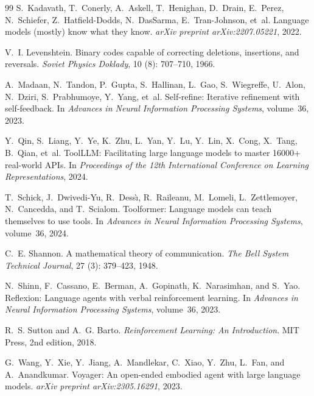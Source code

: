 \begin{thebibliography}{99}
S.~Kadavath, T.~Conerly, A.~Askell, T.~Henighan, D.~Drain, E.~Perez,
  N.~Schiefer, Z.~Hatfield-Dodds, N.~DasSarma, E.~Tran-Johnson, et~al.
\newblock Language models (mostly) know what they know.
\newblock \emph{arXiv preprint arXiv:2207.05221}, 2022.

V.~I. Levenshtein.
\newblock Binary codes capable of correcting deletions, insertions, and
  reversals.
\newblock \emph{Soviet Physics Doklady}, 10 (8): 707--710,
  1966.

A.~Madaan, N.~Tandon, P.~Gupta, S.~Hallinan, L.~Gao, S.~Wiegreffe,
  U.~Alon, N.~Dziri, S.~Prabhumoye, Y.~Yang, et~al.
\newblock Self-refine: Iterative refinement with self-feedback.
\newblock In \emph{Advances in Neural Information Processing Systems},
  volume~36, 2023.

Y.~Qin, S.~Liang, Y.~Ye, K.~Zhu, L.~Yan, Y.~Lu, Y.~Lin, X.~Cong, X.~Tang,
  B.~Qian, et~al.
\newblock ToolLLM: Facilitating large language models to master 16000+
  real-world APIs.
\newblock In \emph{Proceedings of the 12th International Conference on Learning
  Representations}, 2024.

T.~Schick, J.~Dwivedi-Yu, R.~Dess{\`{\i}}, R.~Raileanu, M.~Lomeli,
  L.~Zettlemoyer, N.~Cancedda, and T.~Scialom.
\newblock Toolformer: Language models can teach themselves to use tools.
\newblock In \emph{Advances in Neural Information Processing Systems},
  volume~36, 2024.

C.~E. Shannon.
\newblock A mathematical theory of communication.
\newblock \emph{The Bell System Technical Journal}, 27 (3):
  379--423, 1948.

N.~Shinn, F.~Cassano, E.~Berman, A.~Gopinath, K.~Narasimhan, and S.~Yao.
\newblock Reflexion: Language agents with verbal reinforcement learning.
\newblock In \emph{Advances in Neural Information Processing Systems},
  volume~36, 2023.

R.~S. Sutton and A.~G. Barto.
\newblock \emph{Reinforcement Learning: An Introduction}.
\newblock MIT Press, 2nd edition, 2018.

G.~Wang, Y.~Xie, Y.~Jiang, A.~Mandlekar, C.~Xiao, Y.~Zhu, L.~Fan, and
  A.~Anandkumar.
\newblock Voyager: An open-ended embodied agent with large language models.
\newblock \emph{arXiv preprint arXiv:2305.16291}, 2023.


\end{thebibliography}
